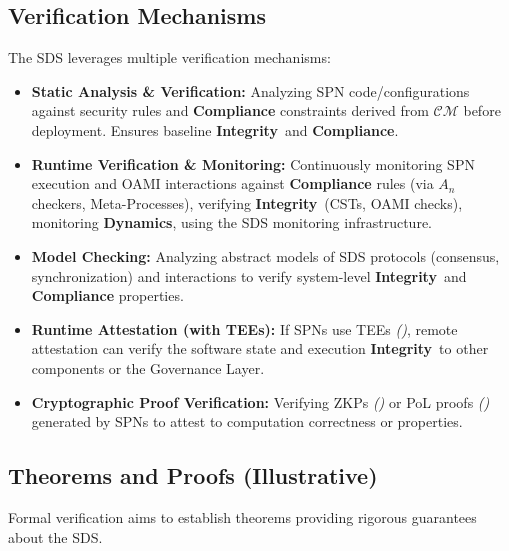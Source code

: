\documentclass[12pt,a4paper]{report}
\renewcommand{\citep}[1]{\textit{\scriptsize{(\cite{#1})}}}
\newcommand{\Integrity}{\textbf{Integrity}}
\newcommand{\Dynamics}{\textbf{Dynamics}}
\begin{document}
	\subsection{Verification Mechanisms} %
	\label{sec:4-4-2} %
	
	The SDS leverages multiple verification mechanisms:
	\begin{itemize}[noitemsep]
		\item \textbf{Static Analysis \& Verification:} Analyzing SPN code/configurations against security rules and \textbf{Compliance} constraints derived from $\mathcal{CM}$ before deployment. Ensures baseline \Integrity\ and \textbf{Compliance}.
		\item \textbf{Runtime Verification \& Monitoring:} Continuously monitoring SPN execution and OAMI interactions against \textbf{Compliance} rules (via $A_n$ checkers, Meta-Processes), verifying \Integrity\ (CSTs, OAMI checks), monitoring \Dynamics, using the SDS monitoring infrastructure.
		\item \textbf{Model Checking:} Analyzing abstract models of SDS protocols (consensus, synchronization) and interactions to verify system-level \Integrity\ and \textbf{Compliance} properties.
		\item \textbf{Runtime Attestation (with TEEs):} If SPNs use TEEs \citep{Citadel_PlusPlus_2025}, remote attestation can verify the software state and execution \Integrity\ to other components or the Governance Layer.
		\item \textbf{Cryptographic Proof Verification:} Verifying ZKPs \citep{Peng2025ZKMLSurvey} or PoL proofs \citep{Jia2021ProofOfLearning} generated by SPNs to attest to computation correctness or properties.
	\end{itemize}
	
	\subsection{Theorems and Proofs (Illustrative)} %
	\label{sec:4-4-3} %
	
	Formal verification aims to establish theorems providing rigorous guarantees about the SDS.
	
\end{document}
